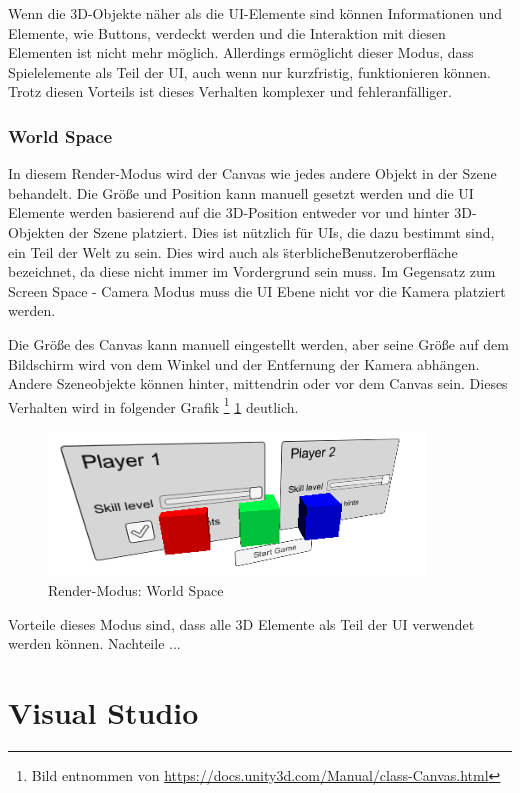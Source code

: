 			Wenn die 3D-Objekte näher als die UI-Elemente sind können Informationen und Elemente, wie Buttons, verdeckt werden und die Interaktion mit diesen Elementen ist nicht mehr möglich. Allerdings ermöglicht dieser Modus, dass Spielelemente als Teil der UI, auch wenn nur kurzfristig, funktionieren können. Trotz diesen Vorteils ist dieses Verhalten komplexer und fehleranfälliger.

		\subsubsection{World Space}
			In diesem Render-Modus wird der Canvas wie jedes andere Objekt in der Szene behandelt. Die Größe und Position kann manuell gesetzt werden und die UI Elemente werden basierend auf die 3D-Position entweder vor und hinter 3D-Objekten der Szene platziert. Dies ist nützlich für UIs, die dazu bestimmt sind, ein Teil der Welt zu sein. Dies wird auch als \"sterbliche\" Benutzeroberfläche bezeichnet, da diese nicht immer im Vordergrund sein muss. Im Gegensatz zum Screen Space - Camera Modus muss die UI Ebene nicht vor die Kamera platziert werden.

			Die Größe des Canvas kann manuell eingestellt werden, aber seine Größe auf dem Bildschirm wird von dem Winkel und der Entfernung der Kamera abhängen. Andere Szeneobjekte können hinter, mittendrin oder vor dem Canvas sein. Dieses Verhalten wird in folgender Grafik \footnote{Bild entnommen von \url{https://docs.unity3d.com/Manual/class-Canvas.html}} \ref{renderWorldSpace} deutlich.

			\begin{figure}[htbp]
				\centering 
				\label{renderWorldSpace}
				\includegraphics[width=10cm]{pics/CanvasWorldSpace.png}
				\caption{Render-Modus: World Space}
			\end{figure}

			Vorteile dieses Modus sind, dass alle 3D Elemente als Teil der UI verwendet werden können. Nachteile ...
			
\section{Visual Studio}

